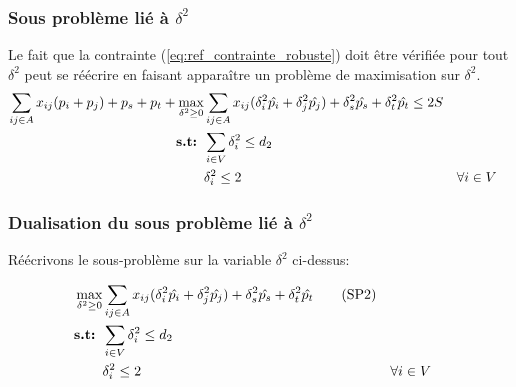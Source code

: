 \documentclass{article}
\begin{document}
\subsubsection{Sous problème lié à $\delta^{2}$}

Le fait que la contrainte (\ref{eq:ref_contrainte_robuste}) doit être vérifiée pour tout $\delta^{2}$ peut se réécrire en faisant apparaître un problème de maximisation sur $\delta^{2}$.
\begin{align}
  \sum_{ij \in A} x_{ij} (p_i + p_j) + p_s + p_t + 
    \max_{\delta^{2} \geq 0} & \sum_{ij \in A} x_{ij}(\delta^{2}_{i} \hat{p_i} + \delta^{2}_{j} \hat{p_j}) + \delta^{2}_{s} \hat{p_s} + \delta^{2}_{t} \hat{p_t} \leq 2S \\
     \textbf{s.t: } & \sum_{i \in V} \delta^{2}_{i} \leq d_2 \notag \\
     & \delta^{2}_{i} \leq 2 && \forall i \in V \notag
\end{align}


\subsubsection{Dualisation du sous problème lié à $\delta^{2}$}

Réécrivons le sous-problème sur la variable $\delta^{2}$ ci-dessus:

\begin{align}
    \max_{\delta^{2} \geq 0} & \sum_{ij \in A} x_{ij}(\delta^{2}_{i} \hat{p_i} + \delta^{2}_{j} \hat{p_j}) + \delta^{2}_{s} \hat{p_s} + \delta^{2}_{t} \hat{p_t} \tag{SP2} \label{eq:sous-prob-2}\\
     \textbf{s.t: } & \sum_{i \in V} \delta^{2}_{i} \leq d_2 \notag \\
     & \delta^{2}_{i} \leq 2 && \forall i \in V \notag
\end{align}
\end{document}
